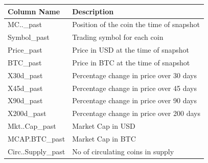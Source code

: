 \documentclass[11pt, english, letterpaper]{article}
\begin{document}
\begin{longtable}{|p{5cm}|p{10cm}|}
\hline
\textbf{Column Name}   & \textbf{Description}                                                                                                                            \\ \hline
\endfirsthead
\endhead
MC..\_past             & Position of the coin the time of snapshot                                                                                                       \\ \hline
Symbol\_past           & Trading symbol for each coin                                                                                                                    \\ \hline
Price\_past            & Price in USD at the time of snapshot                                                                                                            \\ \hline
BTC\_past              & Price in BTC at the time of snapshot                                                                                                            \\ \hline
X30d\_past             & Percentage change in price over 30 days                                                                                                         \\ \hline
X45d\_past             & Percentage change in price over 45 days                                                                                                         \\ \hline
X90d\_past             & Percentage change in price over 90 days                                                                                                         \\ \hline
X200d\_past            & Percentage change in price over 200 days                                                                                                        \\ \hline
Mkt..Cap\_past         & Market Cap in USD                                                                                                                               \\ \hline
MCAP.BTC\_past         & Market Cap in BTC                                                                                                                               \\ \hline
Circ..Supply\_past     & No of circulating coins in supply                                                                                                               \\ \hline

\end{longtable}
\end{document}
